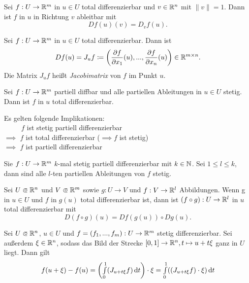 \documentclass{cheat-sheet}
\newcommand\opn{\mathrel{\ooalign{$\subset$\cr
  \hidewidth\raise.1ex\hbox{$\circ\mkern.5mu$}\cr}}}
\begin{document}
\begin{satz}
Sei $f : U \to \mathbb{R}^m$ in $u \in U$ total differenzierbar und $v \in \mathbb{R}^n$ mit $\| v \| = 1$. Dann ist $f$ in $u$ in Richtung $v$ ableitbar mit
\[ D f(u) (v) = D_v f(u). \]
\end{satz}

\begin{defn}
Sei $f : U \to \mathbb{R}^m$ in $u \in U$ total differenzierbar. Dann ist
\[ D f(u) = J_u f \coloneqq \left( \frac{\partial f}{\partial x_1}(u), ..., \frac{\partial f}{\partial x_n}(u) \right) \in \mathbb{R}^{m \times n}. \]
Die Matrix $J_u f$ heißt \emph{Jacobimatrix} von $f$ im Punkt $u$.
\end{defn}


\begin{satz}
Sei $f : U \to \mathbb{R}^m$ partiell diffbar und alle partiellen Ableitungen in $u \in U$ stetig. Dann ist $f$ in $u$ total differenzierbar.
\end{satz}

\begin{bem}
Es gelten folgende Implikationen:\\
$\quad\quad\,\,\, f$ ist stetig partiell differenzierbar\\
$\implies$ $f$ ist total differenzierbar ($\implies f$ ist stetig)\\
$\implies$ $f$ ist partiell differenzierbar
\end{bem}

\begin{satz}
Sie $f : U \to \mathbb{R}^m$ $k$-mal stetig partiell differenzierbar mit $k \in \mathbb{N}$. Sei $1 \le l \le k$, dann sind alle $l$-ten partiellen Ableitungen von $f$ stetig.
\end{satz}

\begin{satz}[Kettenregel]
Sei $U \opn \R^n$ und $V \opn \R^m$ sowie $g : U \to V$ und $f : V \to \mathbb{R}^l$ Abbildungen. Wenn g in $u \in U$ und $f$ in $g(u)$ total differenzierbar ist, dann ist $(f \circ g) : U \to \mathbb{R}^l$ in $u$ total differenzierbar mit
\[ D(f \circ g)(u) = D f(g(u)) \circ D g(u). \]
\end{satz}


\begin{satz}[MWS]
Sei $U \opn \R^n$, $u \in U$ und $f = (f_1, ..., f_m) : U \to \mathbb{R}^m$ stetig differenzierbar. Sei außerdem $\xi \in \mathbb{R}^n$, sodass das Bild der Strecke $[0, 1] \to \mathbb{R}^n, t \mapsto u + t \xi$ ganz in $U$ liegt. Dann gilt
\[ f(u + \xi) - f(u) = \left( {\textstyle \int\limits_{0}^{1}} (J_{u + t \xi} f) \,\mathrm{d} t \right) \cdot \xi = {\textstyle \int\limits_{0}^{1}} ((J_{u + t \xi} f) \cdot \xi) \,\mathrm{d} t \]
\end{satz}
\end{document}
